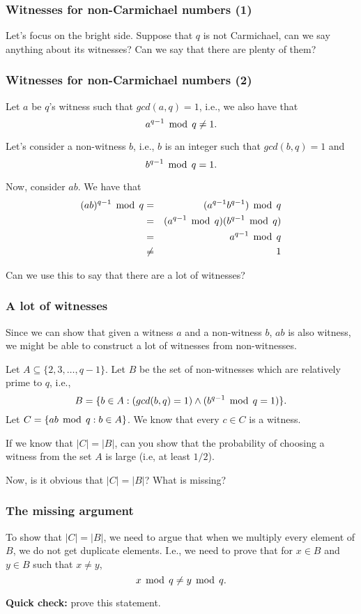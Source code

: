 \begin{frame}\frametitle{Witnesses for non-Carmichael numbers (1)}
  Let's focus on the bright side.  Suppose that $q$ is not Carmichael,
  can we say anything about its witnesses?  Can we say that there are
  plenty of them?
\end{frame}

\begin{frame}\frametitle{Witnesses for non-Carmichael numbers (2)}
  Let $a$ be $q$'s witness such that $gcd(a,q)=1$, i.e., we also have that
  \[ a^{q-1}\,\bmod\, q\neq 1. \]

  Let's consider a non-witness $b$, i.e., $b$ is an integer such that
  $gcd(b,q)=1$ and \[ b^{q-1}\,\bmod\, q=1. \]

  \pause
  Now, consider $ab$.  \pause We have that
  \begin{eqnarray*}
    (ab)^{q-1}\,\bmod\, q &=& (a^{q-1}b^{q-1})\,\bmod\, q \\
    &=& (a^{q-1}\,\bmod\, q)(b^{q-1}\,\bmod\, q)\\
    &=& a^{q-1}\,\bmod\, q\\
    &\neq& 1
  \end{eqnarray*}

  \pause Can we use this to say that there are a lot of witnesses?
\end{frame}

\begin{frame}\frametitle{A lot of witnesses}
  Since we can show that given a witness $a$ and a non-witness $b$,
  $ab$ is also witness, we might be able to construct a lot of
  witnesses from non-witnesses.  \pause
  
  Let $A\subseteq\{2,3,\ldots,q-1\}$.  Let $B$ be the set of
  non-witnesses which are relatively prime to $q$, i.e.,
  \[ B=\{b\in A : (gcd(b,q)=1) \wedge (b^{q-1}\,\bmod\, q = 1)\}. \]
  Let $C=\{ab\,\bmod\, q : b\in A \}$.  We know that every $c\in C$ is a witness.

  \pause If we know that $|C| = |B|$, can you show that the
  probability of choosing a witness from the set $A$ is large (i.e, at
  least $1/2$).

  \pause Now, is it obvious that $|C| = |B|$?  What is missing?
\end{frame}

\begin{frame}\frametitle{The missing argument}
  To show that $|C|=|B|$, we need to argue that when we multiply every
  element of $B$, we do not get duplicate elements.  I.e., we need to
  prove that for $x\in B$ and $y\in B$ such that $x\neq y$,
  \[ x\,\bmod\, q \neq y\,\bmod\, q.\]

  {\bf Quick check:} prove this statement.
\end{frame}

